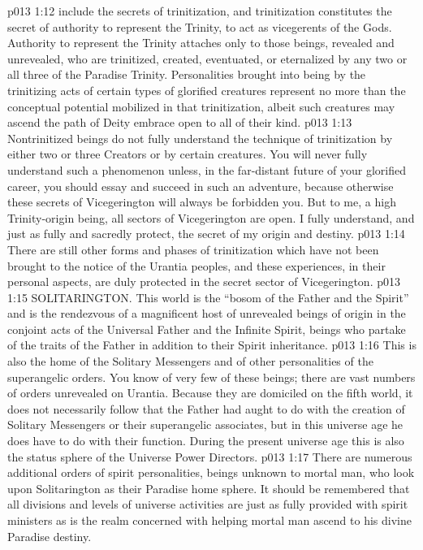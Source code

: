 \vs p013 1:12 \pc {} include the secrets of trinitization, and trinitization constitutes the secret of authority to represent the Trinity, to act as vicegerents of the Gods. Authority to represent the Trinity attaches only to those beings, revealed and unrevealed, who are trinitized, created, eventuated, or eternalized by any two or all three of the Paradise Trinity. Personalities brought into being by the trinitizing acts of certain types of glorified creatures represent no more than the conceptual potential mobilized in that trinitization, albeit such creatures may ascend the path of Deity embrace open to all of their kind.
\vs p013 1:13 Nontrinitized beings do not fully understand the technique of trinitization by either two or three Creators or by certain creatures. You will never fully understand such a phenomenon unless, in the far\hyp{}distant future of your glorified career, you should essay and succeed in such an adventure, because otherwise these secrets of Vicegerington will always be forbidden you. But to me, a high Trinity\hyp{}origin being, all sectors of Vicegerington are open. I fully understand, and just as fully and sacredly protect, the secret of my origin and destiny.
\vs p013 1:14 There are still other forms and phases of trinitization which have not been brought to the notice of the Urantia peoples, and these experiences, in their personal aspects, are duly protected in the secret sector of Vicegerington.
\vs p013 1:15 \bibnobreakspace SOLITARINGTON. This world is the “bosom of the Father and the Spirit” and is the rendezvous of a magnificent host of unrevealed beings of origin in the conjoint acts of the Universal Father and the Infinite Spirit, beings who partake of the traits of the Father in addition to their Spirit inheritance.
\vs p013 1:16 This is also the home of the Solitary Messengers and of other personalities of the superangelic orders. You know of very few of these beings; there are vast numbers of orders unrevealed on Urantia. Because they are domiciled on the fifth world, it does not necessarily follow that the Father had aught to do with the creation of Solitary Messengers or their superangelic associates, but in this universe age he does have to do with their function. During the present universe age this is also the status sphere of the Universe Power Directors.
\vs p013 1:17 There are numerous additional orders of spirit personalities, beings unknown to mortal man, who look upon Solitarington as their Paradise home sphere. It should be remembered that all divisions and levels of universe activities are just as fully provided with spirit ministers as is the realm concerned with helping mortal man ascend to his divine Paradise destiny.
